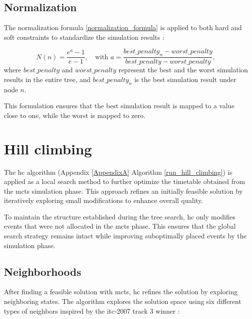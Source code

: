 \subsection{Normalization}

The normalization formula \ref{normalization_formula} is applied to both hard and soft constraints to standardize the simulation results \cite{pedroso_tree_2015}:

\begin{equation}
N(n) = \frac{e^a - 1}{e - 1}, \quad \text{with } a = \frac{best\_penalty_n - worst\_penalty}{best\_penalty - worst\_penalty},\label{normalization_formula}
\end{equation}
where \(best\_penalty\) and \(worst\_penalty\) represent the best and the worst simulation results in the entire tree, and \(best\_penalty_n\) is the best simulation result under node \(n\).

This formulation ensures that the best simulation result is mapped to a value close to one, while the worst is mapped to zero.

\section{Hill climbing}\label{hill_climbing_section}

The \ac{hc} algorithm (Appendix \ref{AppendixA} Algorithm \ref{run_hill_climbing}) is applied as a local search method to further optimize the timetable obtained from the \ac{mcts} simulation phase. This approach refines an initially feasible solution by iteratively exploring small modifications to enhance overall quality.

To maintain the structure established during the tree search, \ac{hc} only modifies events that were not allocated in the \ac{mcts} phase. This ensures that the global search strategy remains intact while improving suboptimally placed events by the simulation phase.

\subsection{Neighborhoods}

After finding a feasible solution with \ac{mcts}, \ac{hc} refines the solution by exploring neighboring states. The algorithm explores the solution space using six different types of neighbors inspired by the \ac{itc-2007} track 3 winner \cite{muller_itc2007}:

